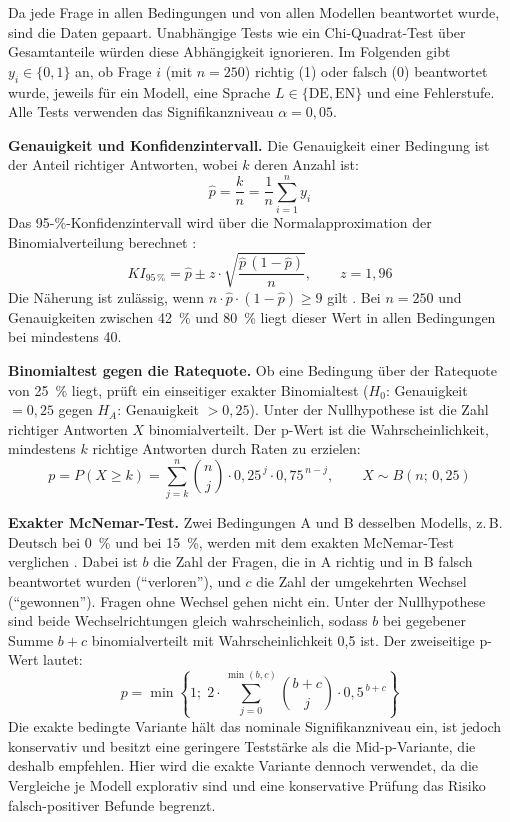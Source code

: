 \documentclass[a4paper,titlepage]{article}
\numberwithin{equation}{section} %
\begin{document}
Da jede Frage in allen Bedingungen und von allen Modellen beantwortet wurde, sind die Daten gepaart. Unabhängige Tests wie ein Chi-Quadrat-Test über Gesamtanteile würden diese Abhängigkeit ignorieren. Im Folgenden gibt $y_i \in \{0, 1\}$ an, ob Frage $i$ (mit $n = 250$) richtig (1) oder falsch (0) beantwortet wurde, jeweils für ein Modell, eine Sprache $L \in \{\mathrm{DE}, \mathrm{EN}\}$ und eine Fehlerstufe. Alle Tests verwenden das Signifikanzniveau $\alpha = 0{,}05$.

\textbf{Genauigkeit und Konfidenzintervall.} Die Genauigkeit einer Bedingung ist der Anteil richtiger Antworten, wobei $k$ deren Anzahl ist:
\begin{equation}\label{eq:p}
\hat{p} = \frac{k}{n} = \frac{1}{n}\sum_{i=1}^{n} y_i
\end{equation}
Das 95-\%-Konfidenzintervall wird über die Normalapproximation der Binomialverteilung berechnet \citep[S.~72, 93--94]{bortz_statistik_2011}:
\begin{equation}\label{eq:ki}
\mathit{KI}_{95\,\%} = \hat{p} \pm z \cdot \sqrt{\frac{\hat{p}\,(1-\hat{p})}{n}}, \qquad z = 1{,}96
\end{equation}
Die Näherung ist zulässig, wenn $n \cdot \hat{p} \cdot (1-\hat{p}) \geq 9$ gilt \citep[S.~72]{bortz_statistik_2011}. Bei $n = 250$ und Genauigkeiten zwischen 42~\% und 80~\% liegt dieser Wert in allen Bedingungen bei mindestens 40.

\textbf{Binomialtest gegen die Ratequote.} Ob eine Bedingung über der Ratequote von 25~\% liegt, prüft ein einseitiger exakter Binomialtest ($H_0$: Genauigkeit $= 0{,}25$ gegen $H_A$: Genauigkeit $> 0{,}25$). Unter der Nullhypothese ist die Zahl richtiger Antworten $X$ binomialverteilt. Der p-Wert ist die Wahrscheinlichkeit, mindestens $k$ richtige Antworten durch Raten zu erzielen:
\begin{equation}\label{eq:binom}
p = P(X \geq k) = \sum_{j=k}^{n} \binom{n}{j} \cdot 0{,}25^{\,j} \cdot 0{,}75^{\,n-j}, \qquad X \sim B(n;\, 0{,}25)
\end{equation}

\textbf{Exakter McNemar-Test.} Zwei Bedingungen A und B desselben Modells, z.\,B. Deutsch bei 0~\% und bei 15~\%, werden mit dem exakten McNemar-Test verglichen \citep{mcnemar_note_1947, fagerland_mcnemar_2013}. Dabei ist $b$ die Zahl der Fragen, die in A richtig und in B falsch beantwortet wurden ("`verloren"'), und $c$ die Zahl der umgekehrten Wechsel ("`gewonnen"'). Fragen ohne Wechsel gehen nicht ein. Unter der Nullhypothese sind beide Wechselrichtungen gleich wahrscheinlich, sodass $b$ bei gegebener Summe $b + c$ binomialverteilt mit Wahrscheinlichkeit 0,5 ist. Der zweiseitige p-Wert lautet:
\begin{equation}\label{eq:mcnemar}
p = \min\left\{ 1;\; 2 \cdot \sum_{j=0}^{\min(b,c)} \binom{b+c}{j} \cdot 0{,}5^{\,b+c} \right\}
\end{equation}
Die exakte bedingte Variante hält das nominale Signifikanzniveau ein, ist jedoch konservativ und besitzt eine geringere Teststärke als die Mid-p-Variante, die \citet{fagerland_mcnemar_2013} deshalb empfehlen. Hier wird die exakte Variante dennoch verwendet, da die Vergleiche je Modell explorativ sind und eine konservative Prüfung das Risiko falsch-positiver Befunde begrenzt.
\end{document}
